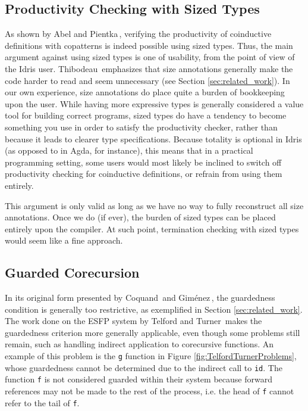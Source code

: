 \subsection{Productivity Checking with Sized Types}
As shown by Abel and Pientka\,\citep{Abel13Wellfounded}, verifying the productivity of coinductive definitions with copatterns is indeed possible using sized types. Thus, the main argument against using sized types is one of usability, from the point of view of the Idris user. Thibodeau\,\citep{Thibodeau11} emphasizes that size annotations generally make the code harder to read and seem unnecessary (see Section \ref{sec:related_work}). In our own experience, size annotations do place quite a burden of bookkeeping upon the user. While having more expressive types is generally considered a value tool for building correct programs, sized types do have a tendency to become something you use in order to satisfy the productivity checker, rather than because it leads to clearer type specifications. Because totality is optional in Idris (as opposed to in Agda, for instance), this means that in a practical programming setting, some users would most likely be inclined to switch off productivity checking for coinductive definitions, or refrain from using them entirely.

This argument is only valid as long as we have no way to fully reconstruct all size annotations. Once we do (if ever), the burden of sized types can be placed entirely upon the compiler. At such point, termination checking with sized types would seem like a fine approach.

\subsection{Guarded Corecursion}
In its original form presented by Coquand\,\citep{Coquand94} and Gim\'{e}nez\,\citep{Gimenez95}, the guardedness condition is generally too restrictive, as exemplified in Section \ref{sec:related_work}. The work done on the ESFP system by Telford and Turner\,\citep{Telford97ensuringstreams,Telford98ensuringthe} makes the guardedness criterion more generally applicable, even though some problems still remain, such as handling indirect application to corecursive functions. An example of this problem is the \texttt{g} function in Figure \ref{fig:TelfordTurnerProblems}, whose guardedness cannot be determined due to the indirect call to \texttt{id}. The function \texttt{f} is not considered guarded within their system because forward references may not be made to the rest of the process, i.e. the head of \texttt{f} cannot refer to the tail of \texttt{f}.

